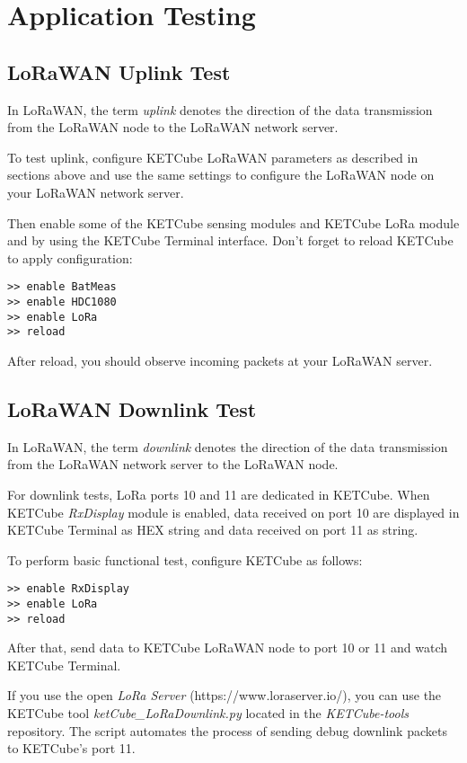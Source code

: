 \clearpage
\section{Application Testing}
\subsection{LoRaWAN Uplink Test}
In LoRaWAN, the term {\it uplink} denotes the direction of the data transmission from the LoRaWAN node to the LoRaWAN network server.

To test uplink, configure KETCube LoRaWAN parameters as described in sections above and use the same settings to configure the LoRaWAN node on your LoRaWAN network server.

Then enable some of the KETCube sensing modules and KETCube LoRa module and by using the KETCube Terminal interface. Don't forget to reload KETCube to apply configuration:

\begin{Verbatim}[frame=single, fontsize=\small]
>> enable BatMeas
>> enable HDC1080
>> enable LoRa
>> reload
\end{Verbatim}

After reload, you should observe incoming packets at your LoRaWAN server.

\subsection{LoRaWAN Downlink Test}
In LoRaWAN, the term {\it downlink} denotes the direction of the data transmission from the LoRaWAN network server to the LoRaWAN node.

For downlink tests, LoRa ports 10 and 11 are dedicated in KETCube. When KETCube {\it RxDisplay} module is enabled, data received on port 10 are displayed in KETCube Terminal as HEX string and data received on port 11 as string.

To perform basic functional test, configure KETCube as follows:
\begin{Verbatim}[frame=single, fontsize=\small]
>> enable RxDisplay
>> enable LoRa
>> reload
\end{Verbatim}

After that, send data to KETCube LoRaWAN node to port 10 or 11 and watch KETCube Terminal.

If you use the open {\it LoRa Server} ({https://www.loraserver.io/}), you can use the KETCube tool {\it ketCube\_LoRaDownlink.py} located in the {\it KETCube-tools} repository. The script automates the process of sending debug downlink packets to KETCube's port 11.


\clearpage





